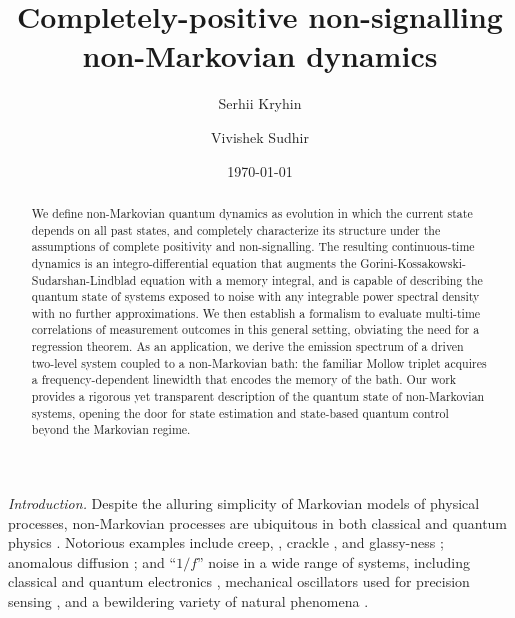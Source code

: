 \documentclass[
    11pt,
    letterpaper,
    reprint,
    notitlepage,
    superscriptaddress,
    aps,prx
]{revtex4-2}
\begin{document}
\title{Completely-positive non-signalling non-Markovian dynamics}

\author{Serhii Kryhin}

\author{Vivishek Sudhir}

\date{\today}

\begin{abstract}
We define non-Markovian quantum dynamics as evolution in which the current state depends on 
all past states, and completely characterize its structure under the assumptions of 
complete positivity and non-signalling.
The resulting continuous-time dynamics is an integro-differential equation that augments the 
Gorini-Kossakowski-Sudarshan-Lindblad equation with a memory integral, 
and is capable of describing the quantum state of systems exposed to noise with 
any integrable power spectral density with no further approximations.
We then establish a formalism to evaluate multi-time correlations of 
measurement outcomes in this general setting, obviating the need for a regression theorem.
As an application, we derive the emission spectrum of a driven two-level system 
coupled to a non-Markovian bath: the familiar Mollow triplet 
acquires a frequency-dependent linewidth that encodes the memory of the bath.
Our work provides a rigorous yet transparent description of the quantum state 
of non-Markovian systems, 
opening the door for state estimation and state-based quantum control 
beyond the Markovian regime.
\end{abstract}

\maketitle



\emph{Introduction.}
Despite the alluring simplicity of Markovian models of physical processes,
non-Markovian processes are ubiquitous in both classical and quantum 
physics \cite{Kubo,Kam23,BP02}.
Notorious examples include creep, \cite{Tsch89}, crackle \cite{Seth01}, and glassy-ness \cite{Phill96}; anomalous diffusion \cite{BouGeo90}; and
``$1/f$'' noise in a wide range of systems, including classical \cite{Calo74,Ziel79} and 
quantum electronics \cite{PalAlt14,BrowBla15,MullLise19,RowOliv23,YonTar23}, 
mechanical oscillators used for precision sensing \cite{Attkinson1963,Saul90,Kuro99,GrobAsp15,FedKipp18,CripCorbitt19}, 
and a bewildering variety of natural phenomena \cite{Mand68,West90}.
\end{document}
